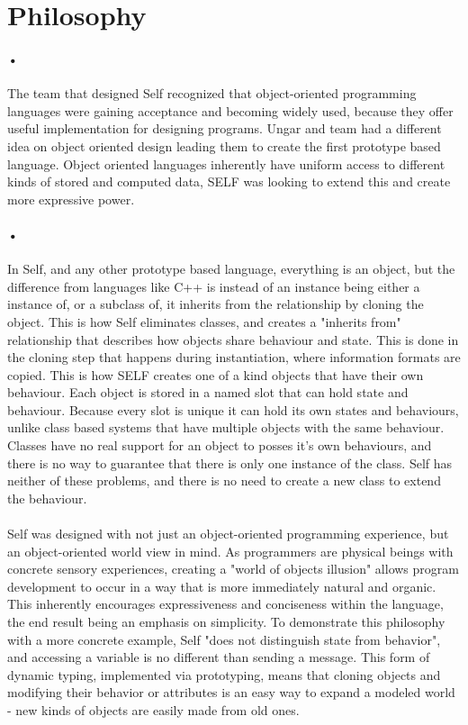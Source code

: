 \documentclass[12pt]{article}
\begin{document}
\section{Philosophy}
\paragraph{•} The team that designed Self recognized that object-oriented programming languages were gaining acceptance and becoming widely used, because they offer useful implementation for designing programs. Ungar and team had a different idea on object oriented design leading them to create the first prototype based language. Object oriented languages inherently have uniform access to different kinds of stored and computed data, SELF was looking to extend this and create more expressive power. \cite{power}

\paragraph{•} In Self, and any other prototype based language, everything is an object, but the difference from languages like C++ is instead of an instance being either a instance of, or a subclass of, it inherits from the relationship by cloning the object. This is how Self eliminates classes, and creates a "inherits from" relationship that describes how objects share behaviour and state. This is done in the cloning step that happens during instantiation, where information formats are copied. This is how SELF creates one of a kind objects that have their own behaviour. Each object is stored in a named slot that can hold state and behaviour. Because every slot is unique it can hold its own states and behaviours, unlike class based systems that have multiple objects with the same behaviour. Classes have no real support for an object to posses it's own behaviours, and there is no way to guarantee that there is only one instance of the class. Self has neither of these problems, and there is no need to create a new class to extend the behaviour. \cite{power}

\paragraph{} Self was designed with not just an object-oriented programming experience, but an object-oriented world view in mind. As programmers are physical beings with concrete sensory experiences, creating a "world of objects illusion" \cite{experience} allows program development to occur in a way that is more immediately natural and organic. This inherently encourages expressiveness and conciseness within the language, the end result being an emphasis on simplicity. To demonstrate this philosophy with a more concrete example, Self "does not distinguish state from behavior"\cite{self}, and accessing a variable is no different than sending a message. This form of dynamic typing, implemented via prototyping, means that cloning objects and modifying their behavior or attributes is an easy way to expand a modeled world - new kinds of objects are easily made from old ones. 
\end{document}
